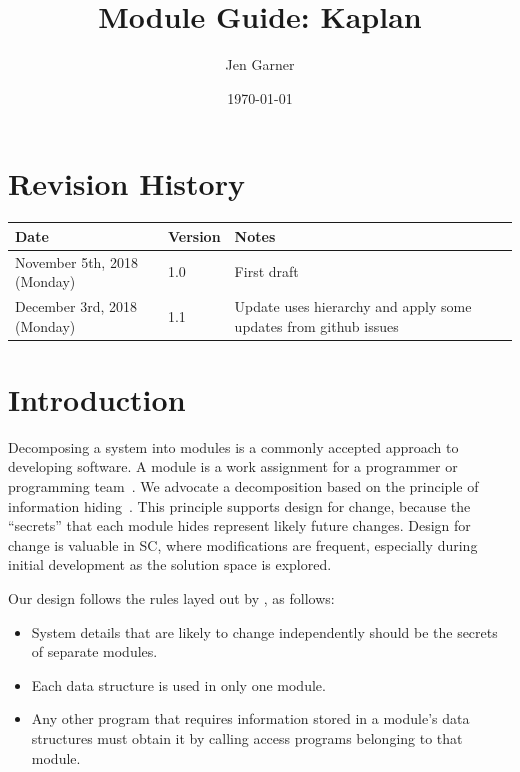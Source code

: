 \documentclass[12pt, titlepage]{article}
\newcommand{\progname}{Kaplan} %
\begin{document}
\title{Module Guide: \progname{}} 
\author{Jen Garner}
\date{\today}

\maketitle


\section{Revision History}

\begin{tabularx}{\textwidth}{p{3cm}p{2cm}X}
\toprule {\bf Date} & {\bf Version} & {\bf Notes}\\
\midrule
November 5th, 2018 (Monday) & 1.0 & First draft \\
December 3rd, 2018 (Monday) & 1.1 & Update uses hierarchy and apply some 
updates from github issues \\
\bottomrule
\end{tabularx}

\newpage

\tableofcontents

\listoftables

\listoffigures

\newpage


\section{Introduction}

Decomposing a system into modules is a commonly accepted approach to developing
software.  A module is a work assignment for a programmer or programming
team~\citep{ParnasEtAl1984}.  We advocate a decomposition
based on the principle of information hiding~\citep{Parnas1972a}.  This
principle supports design for change, because the ``secrets'' that each module
hides represent likely future changes.  Design for change is valuable in SC,
where modifications are frequent, especially during initial development as the
solution space is explored.  

Our design follows the rules layed out by \citet{ParnasEtAl1984}, as follows:
\begin{itemize}
\item System details that are likely to change independently should be the
  secrets of separate modules.
\item Each data structure is used in only one module.
\item Any other program that requires information stored in a module's data
  structures must obtain it by calling access programs belonging to that module.
\end{itemize}
\end{document}
